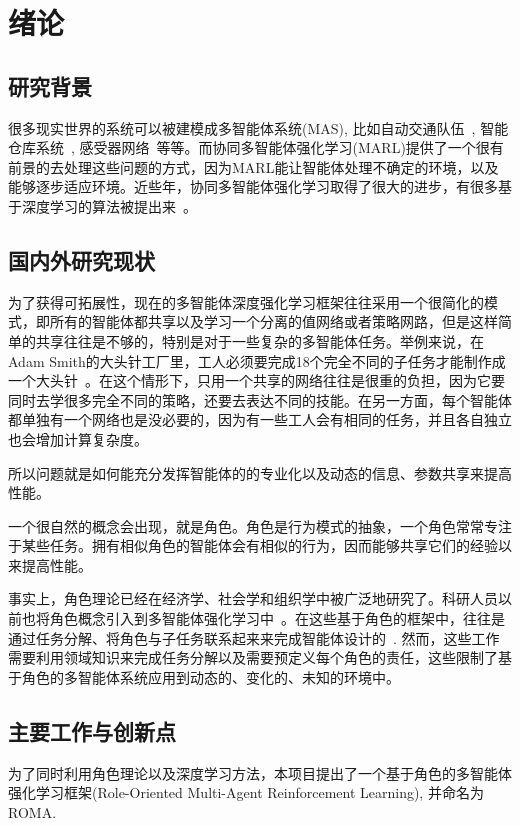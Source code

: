 
\chapter{绪论}
\section{研究背景}
很多现实世界的系统可以被建模成多智能体系统(MAS), 比如自动交通队伍~\cite{cao2012overview}, 智能仓库系统~\cite{nowe2012game}, 感受器网络~\cite{zhang2011coordinated}等等。而协同多智能体强化学习(MARL)提供了一个很有前景的去处理这些问题的方式，因为MARL能让智能体处理不确定的环境，以及能够逐步适应环境。近些年，协同多智能体强化学习取得了很大的进步，有很多基于深度学习的算法被提出来~\cite{foerster2018counterfactual, sunehag2018value, rashid2018qmix, son2019qtran, vinyals2019grandmaster, wang2020learning, baker2020emergent}。

\section{国内外研究现状}
为了获得可拓展性，现在的多智能体深度强化学习框架往往采用一个很简化的模式，即所有的智能体都共享以及学习一个分离的值网络或者策略网路，但是这样简单的共享往往是不够的，特别是对于一些复杂的多智能体任务。举例来说，在Adam Smith的大头针工厂里，工人必须要完成18个完全不同的子任务才能制作成一个大头针~\cite{smith1937wealth}。在这个情形下，只用一个共享的网络往往是很重的负担，因为它要同时去学很多完全不同的策略，还要去表达不同的技能。在另一方面，每个智能体都单独有一个网络也是没必要的，因为有一些工人会有相同的任务，并且各自独立也会增加计算复杂度。

所以问题就是如何能充分发挥智能体的的专业化以及动态的信息、参数共享来提高性能。

一个很自然的概念会出现，就是角色。角色是行为模式的抽象，一个角色常常专注于某些任务。拥有相似角色的智能体会有相似的行为，因而能够共享它们的经验以来提高性能。

事实上，角色理论已经在经济学、社会学和组织学中被广泛地研究了。科研人员以前也将角色概念引入到多智能体强化学习中~\cite{becht1999rope, stone1999task, depke2001roles, ferber2003agents, odell2004metamodel, bonjean2014adelfe, Lhaksmana2018role}。在这些基于角色的框架中，往往是通过任务分解、将角色与子任务联系起来来完成智能体设计的~\cite{zhu2008role}. 然而，这些工作需要利用领域知识来完成任务分解以及需要预定义每个角色的责任，这些限制了基于角色的多智能体系统应用到动态的、变化的、未知的环境中。

\section{主要工作与创新点}
为了同时利用角色理论以及深度学习方法，本项目提出了一个基于角色的多智能体强化学习框架(Role-Oriented Multi-Agent Reinforcement Learning), 并命名为ROMA.

